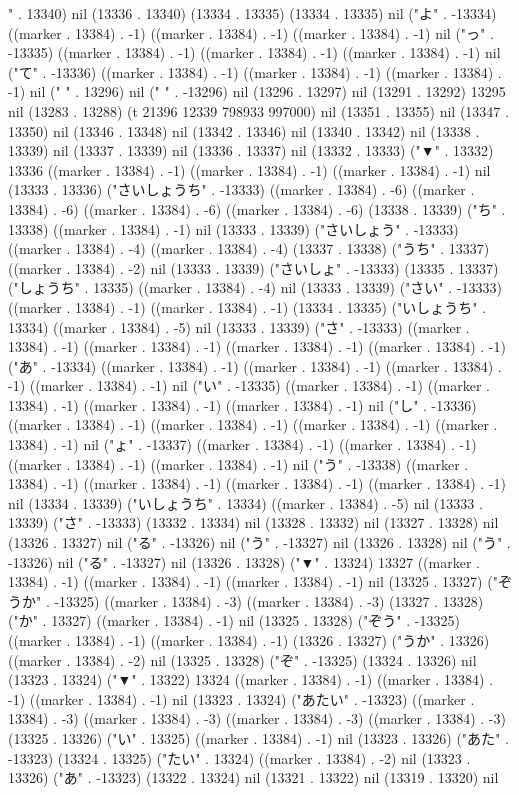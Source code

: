 " . 13340) nil (13336 . 13340) (13334 . 13335) (13334 . 13335) nil ("よ" . -13334) ((marker . 13384) . -1) ((marker . 13384) . -1) ((marker . 13384) . -1) nil ("っ" . -13335) ((marker . 13384) . -1) ((marker . 13384) . -1) ((marker . 13384) . -1) nil ("て" . -13336) ((marker . 13384) . -1) ((marker . 13384) . -1) ((marker . 13384) . -1) nil ("
" . 13296) nil ("
" . -13296) nil (13296 . 13297) nil (13291 . 13292) 13295 nil (13283 . 13288) (t 21396 12339 798933 997000) nil (13351 . 13355) nil (13347 . 13350) nil (13346 . 13348) nil (13342 . 13346) nil (13340 . 13342) nil (13338 . 13339) nil (13337 . 13339) nil (13336 . 13337) nil (13332 . 13333) ("▼" . 13332) 13336 ((marker . 13384) . -1) ((marker . 13384) . -1) ((marker . 13384) . -1) nil (13333 . 13336) ("さいしょうち" . -13333) ((marker . 13384) . -6) ((marker . 13384) . -6) ((marker . 13384) . -6) ((marker . 13384) . -6) (13338 . 13339) ("ち" . 13338) ((marker . 13384) . -1) nil (13333 . 13339) ("さいしょう" . -13333) ((marker . 13384) . -4) ((marker . 13384) . -4) (13337 . 13338) ("うち" . 13337) ((marker . 13384) . -2) nil (13333 . 13339) ("さいしょ" . -13333) (13335 . 13337) ("しょうち" . 13335) ((marker . 13384) . -4) nil (13333 . 13339) ("さい" . -13333) ((marker . 13384) . -1) ((marker . 13384) . -1) (13334 . 13335) ("いしょうち" . 13334) ((marker . 13384) . -5) nil (13333 . 13339) ("さ" . -13333) ((marker . 13384) . -1) ((marker . 13384) . -1) ((marker . 13384) . -1) ((marker . 13384) . -1) ("あ" . -13334) ((marker . 13384) . -1) ((marker . 13384) . -1) ((marker . 13384) . -1) ((marker . 13384) . -1) nil ("い" . -13335) ((marker . 13384) . -1) ((marker . 13384) . -1) ((marker . 13384) . -1) ((marker . 13384) . -1) nil ("し" . -13336) ((marker . 13384) . -1) ((marker . 13384) . -1) ((marker . 13384) . -1) ((marker . 13384) . -1) nil ("ょ" . -13337) ((marker . 13384) . -1) ((marker . 13384) . -1) ((marker . 13384) . -1) ((marker . 13384) . -1) nil ("う" . -13338) ((marker . 13384) . -1) ((marker . 13384) . -1) ((marker . 13384) . -1) ((marker . 13384) . -1) nil (13334 . 13339) ("いしょうち" . 13334) ((marker . 13384) . -5) nil (13333 . 13339) ("さ" . -13333) (13332 . 13334) nil (13328 . 13332) nil (13327 . 13328) nil (13326 . 13327) nil ("る" . -13326) nil ("う" . -13327) nil (13326 . 13328) nil ("う" . -13326) nil ("る" . -13327) nil (13326 . 13328) ("▼" . 13324) 13327 ((marker . 13384) . -1) ((marker . 13384) . -1) ((marker . 13384) . -1) nil (13325 . 13327) ("ぞうか" . -13325) ((marker . 13384) . -3) ((marker . 13384) . -3) (13327 . 13328) ("か" . 13327) ((marker . 13384) . -1) nil (13325 . 13328) ("ぞう" . -13325) ((marker . 13384) . -1) ((marker . 13384) . -1) (13326 . 13327) ("うか" . 13326) ((marker . 13384) . -2) nil (13325 . 13328) ("ぞ" . -13325) (13324 . 13326) nil (13323 . 13324) ("▼" . 13322) 13324 ((marker . 13384) . -1) ((marker . 13384) . -1) ((marker . 13384) . -1) nil (13323 . 13324) ("あたい" . -13323) ((marker . 13384) . -3) ((marker . 13384) . -3) ((marker . 13384) . -3) ((marker . 13384) . -3) (13325 . 13326) ("い" . 13325) ((marker . 13384) . -1) nil (13323 . 13326) ("あた" . -13323) (13324 . 13325) ("たい" . 13324) ((marker . 13384) . -2) nil (13323 . 13326) ("あ" . -13323) (13322 . 13324) nil (13321 . 13322) nil (13319 . 13320) nil 